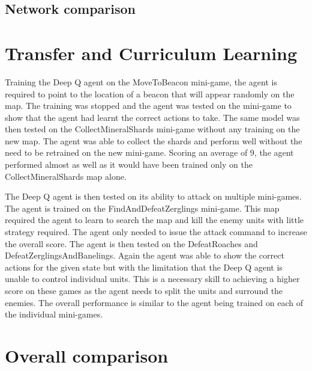 \subsection{Network comparison}


\section{Transfer and Curriculum Learning}

Training the Deep Q agent on the MoveToBeacon mini-game, the agent is required
to point to the location of a beacon that will appear randomly on the map. The
training was stopped and the agent was tested on the mini-game to show that the
agent had learnt the correct actions to take. The same model was then tested on
the CollectMineralShards mini-game without any training on the new map. The
agent was able to collect the shards and perform well without the need to be
retrained on the new mini-game. Scoring an average of 9, the agent performed
almost as well as it would have been trained only on the CollectMineralShards
map alone.

The Deep Q agent is then tested on its ability to attack on multiple mini-games.
The agent is trained on the FindAndDefeatZerglings mini-game. This map required
the agent to learn to search the map and kill the enemy units with little
strategy required. The agent only needed to issue the attack command to increase
the overall score. The agent is then tested on the DefeatRoaches and
DefeatZerglingsAndBanelings. Again the agent was able to show the correct
actions for the given state but with the limitation that the Deep Q agent is
unable to control individual units. This is a necessary skill to achieving a
higher score on these games as the agent needs to split the units and surround
the enemies. The overall performance is similar to the agent being trained on
each of the individual mini-games.


\section{Overall comparison}

